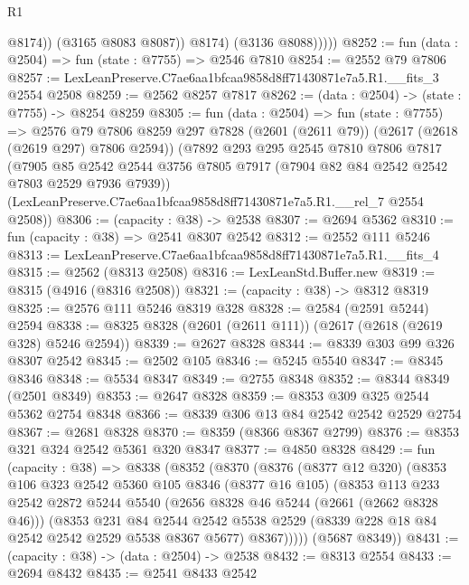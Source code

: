 \begin{lexlean}{R1}
\begin{coremodule}
                    @8174))
                (@3165 @8083 @8087))
              @8174)
            (@3136 @8088)))))
@8252 := fun (data : @2504) => fun (state : @7755) => @2546 @7810
@8254 := @2552 @79 @7806
@8257 := LexLeanPreserve.C7ae6aa1bfcaa9858d8ff71430871e7a5.R1.__fits_3 @2554 @2508
@8259 := @2562 @8257 @7817
@8262 := (data : @2504) -> (state : @7755) -> @8254 @8259
@8305 := fun (data : @2504) =>
  fun (state : @7755) =>
  @2576
    @79
    @7806
    @8259
    @297
    @7828
    (@2601 (@2611 @79))
    (@2617 (@2618 (@2619 @297) @7806 @2594))
    (@7892
      @293
      @295
      @2545
      @7810
      @7806
      @7817
      (@7905 @85 @2542 @2544 @3756 @7805 @7917 (@7904 @82 @84 @2542 @2542 @7803 @2529 @7936 @7939))
      (LexLeanPreserve.C7ae6aa1bfcaa9858d8ff71430871e7a5.R1.__rel_7 @2554 @2508))
@8306 := (capacity : @38) -> @2538
@8307 := @2694 @5362
@8310 := fun (capacity : @38) => @2541 @8307 @2542
@8312 := @2552 @111 @5246
@8313 := LexLeanPreserve.C7ae6aa1bfcaa9858d8ff71430871e7a5.R1.__fits_4
@8315 := @2562 (@8313 @2508)
@8316 := LexLeanStd.Buffer.new
@8319 := @8315 (@4916 (@8316 @2508))
@8321 := (capacity : @38) -> @8312 @8319
@8325 := @2576 @111 @5246 @8319 @328
@8328 := @2584 (@2591 @5244) @2594
@8338 := @8325 @8328 (@2601 (@2611 @111)) (@2617 (@2618 (@2619 @328) @5246 @2594))
@8339 := @2627 @8328
@8344 := @8339 @303 @99 @326 @8307 @2542
@8345 := @2502 @105
@8346 := @5245 @5540
@8347 := @8345 @8346
@8348 := @5534 @8347
@8349 := @2755 @8348
@8352 := @8344 @8349 (@2501 @8349)
@8353 := @2647 @8328
@8359 := @8353 @309 @325 @2544 @5362 @2754 @8348
@8366 := @8339 @306 @13 @84 @2542 @2542 @2529 @2754
@8367 := @2681 @8328
@8370 := @8359 (@8366 @8367 @2799)
@8376 := @8353 @321 @324 @2542 @5361 @320 @8347
@8377 := @4850 @8328
@8429 := fun (capacity : @38) =>
  @8338
    (@8352
      (@8370
        (@8376
          (@8377 @12 @320)
          (@8353
            @106
            @323
            @2542
            @5360
            @105
            @8346
            (@8377 @16 @105)
            (@8353
              @113
              @233
              @2542
              @2872
              @5244
              @5540
              (@2656 @8328 @46 @5244 (@2661 (@2662 @8328 @46)))
              (@8353
                @231
                @84
                @2544
                @2542
                @5538
                @2529
                (@8339 @228 @18 @84 @2542 @2542 @2529 @5538 @8367 @5677)
                @8367)))))
      (@5687 @8349))
@8431 := (capacity : @38) -> (data : @2504) -> @2538
@8432 := @8313 @2554
@8433 := @2694 @8432
@8435 := @2541 @8433 @2542

\end{coremodule}
\end{lexlean}
